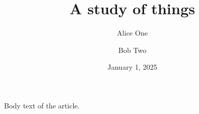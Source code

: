 \documentclass{amsart}
\title[Short title]{A study of things}
\author[A. One]{Alice One}
\author{Bob Two}
\date{January 1, 2025}
\begin{document}
\maketitle
Body text of the article.
\end{document}
